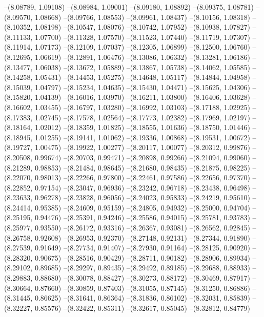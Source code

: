 --(8.08789, 1.09108)
--(8.08984, 1.09001)
--(8.09180, 1.08892)
--(8.09375, 1.08781)
--(8.09570, 1.08668)
--(8.09766, 1.08553)
--(8.09961, 1.08437)
--(8.10156, 1.08318)
--(8.10352, 1.08198)
--(8.10547, 1.08076)
--(8.10742, 1.07952)
--(8.10938, 1.07827)
--(8.11133, 1.07700)
--(8.11328, 1.07570)
--(8.11523, 1.07440)
--(8.11719, 1.07307)
--(8.11914, 1.07173)
--(8.12109, 1.07037)
--(8.12305, 1.06899)
--(8.12500, 1.06760)
--(8.12695, 1.06619)
--(8.12891, 1.06476)
--(8.13086, 1.06332)
--(8.13281, 1.06186)
--(8.13477, 1.06038)
--(8.13672, 1.05889)
--(8.13867, 1.05738)
--(8.14062, 1.05585)
--(8.14258, 1.05431)
--(8.14453, 1.05275)
--(8.14648, 1.05117)
--(8.14844, 1.04958)
--(8.15039, 1.04797)
--(8.15234, 1.04635)
--(8.15430, 1.04471)
--(8.15625, 1.04306)
--(8.15820, 1.04139)
--(8.16016, 1.03970)
--(8.16211, 1.03800)
--(8.16406, 1.03628)
--(8.16602, 1.03455)
--(8.16797, 1.03280)
--(8.16992, 1.03103)
--(8.17188, 1.02925)
--(8.17383, 1.02745)
--(8.17578, 1.02564)
--(8.17773, 1.02382)
--(8.17969, 1.02197)
--(8.18164, 1.02012)
--(8.18359, 1.01825)
--(8.18555, 1.01636)
--(8.18750, 1.01446)
--(8.18945, 1.01255)
--(8.19141, 1.01062)
--(8.19336, 1.00868)
--(8.19531, 1.00672)
--(8.19727, 1.00475)
--(8.19922, 1.00277)
--(8.20117, 1.00077)
--(8.20312, 0.99876)
--(8.20508, 0.99674)
--(8.20703, 0.99471)
--(8.20898, 0.99266)
--(8.21094, 0.99060)
--(8.21289, 0.98853)
--(8.21484, 0.98645)
--(8.21680, 0.98435)
--(8.21875, 0.98225)
--(8.22070, 0.98013)
--(8.22266, 0.97800)
--(8.22461, 0.97586)
--(8.22656, 0.97370)
--(8.22852, 0.97154)
--(8.23047, 0.96936)
--(8.23242, 0.96718)
--(8.23438, 0.96498)
--(8.23633, 0.96278)
--(8.23828, 0.96056)
--(8.24023, 0.95833)
--(8.24219, 0.95610)
--(8.24414, 0.95385)
--(8.24609, 0.95159)
--(8.24805, 0.94932)
--(8.25000, 0.94704)
--(8.25195, 0.94476)
--(8.25391, 0.94246)
--(8.25586, 0.94015)
--(8.25781, 0.93783)
--(8.25977, 0.93550)
--(8.26172, 0.93316)
--(8.26367, 0.93081)
--(8.26562, 0.92845)
--(8.26758, 0.92608)
--(8.26953, 0.92370)
--(8.27148, 0.92131)
--(8.27344, 0.91890)
--(8.27539, 0.91649)
--(8.27734, 0.91407)
--(8.27930, 0.91164)
--(8.28125, 0.90920)
--(8.28320, 0.90675)
--(8.28516, 0.90429)
--(8.28711, 0.90182)
--(8.28906, 0.89934)
--(8.29102, 0.89685)
--(8.29297, 0.89435)
--(8.29492, 0.89185)
--(8.29688, 0.88933)
--(8.29883, 0.88680)
--(8.30078, 0.88427)
--(8.30273, 0.88172)
--(8.30469, 0.87917)
--(8.30664, 0.87660)
--(8.30859, 0.87403)
--(8.31055, 0.87145)
--(8.31250, 0.86886)
--(8.31445, 0.86625)
--(8.31641, 0.86364)
--(8.31836, 0.86102)
--(8.32031, 0.85839)
--(8.32227, 0.85576)
--(8.32422, 0.85311)
--(8.32617, 0.85045)
--(8.32812, 0.84779)
